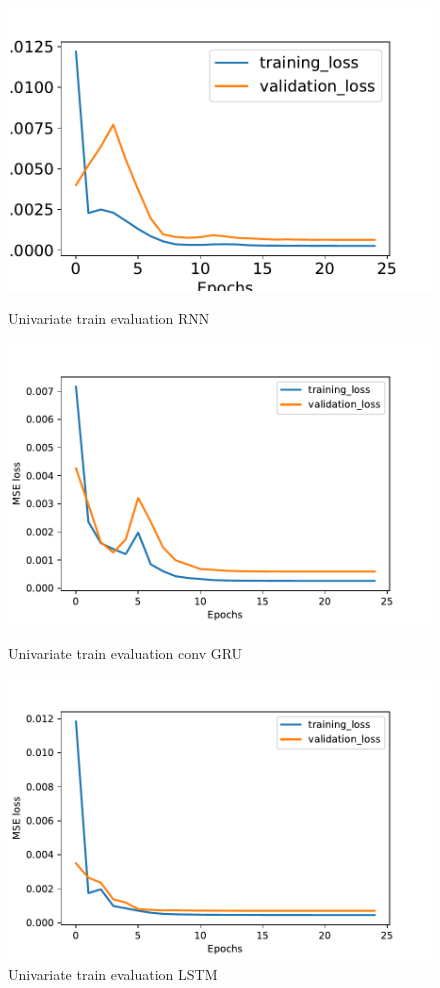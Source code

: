 \documentclass
[twocolumn,
secnumarabic,
nobibnotes,
aps,
prl,
reprint,
groupedaddress,
amsmath,
amssymb,
]{revtex4-2}
\begin{document}
\begin{figure}
  \includegraphics[width=\columnwidth]{figures/univariate_train_evaluation_RNN.pdf}
  \caption{\label{fig:univariate_train_evaluation_RNN} Univariate train evaluation RNN}
  \includegraphics[width=\columnwidth]{figures/univariate_train_evaluation_convGRU.pdf}
  \caption{\label{fig:univariate_train_evaluation_ConvGRU} Univariate train evaluation conv GRU}
  \includegraphics[width=\columnwidth]{figures/univariate_train_evaluation_LSTM.pdf}
  \caption{\label{fig:univariate_train_evaluation_LSTM} Univariate train evaluation LSTM}
\end{figure}
\end{document}
